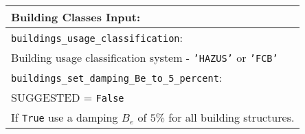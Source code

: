 \documentclass[a4paper, 12pt]{report}
\begin{document}
\vspace{2em}
\begin{tabular}{|p{\textwidth}|}
\hline
\vspace{0.3em} \noindent \Large \textbf{Building Classes Input:} \normalsize \\
\hline \vspace{0.1em} \texttt{buildings\_usage\_classification}: \\
Building usage classification system - \texttt{'HAZUS'} or \texttt{'FCB'} \\
\hline \vspace{0.1em}
\texttt{buildings\_set\_damping\_Be\_to\_5\_percent}: \\
SUGGESTED = \texttt{False} \\
If \texttt{True} use a damping $B_e$ of $5\%$ for all building structures.\\
\hline
 \end{tabular}
\end{document}
